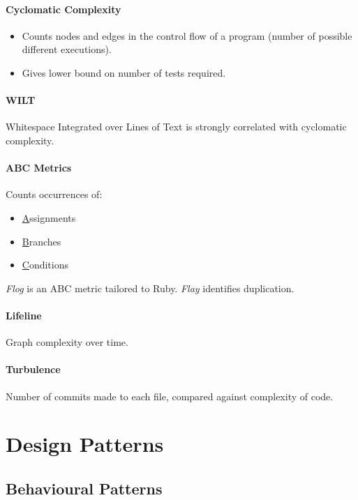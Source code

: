 \documentclass[twocolumn,english]{article}
\begin{document}
\paragraph{Cyclomatic Complexity}
\begin{itemize}
\item Counts nodes and edges in the control flow of a program (number of
possible different executions).
\item Gives lower bound on number of tests required.
\end{itemize}

\paragraph{WILT}

Whitespace Integrated over Lines of Text is strongly correlated with
cyclomatic complexity.

\paragraph{ABC Metrics}

Counts occurrences of:
\begin{itemize}
\item \uline{A}ssignments
\item \uline{B}ranches
\item \uline{C}onditions
\end{itemize}
\emph{Flog} is an ABC metric tailored to Ruby. \emph{Flay} identifies
duplication.

\paragraph{Lifeline}

Graph complexity over time.

\paragraph{Turbulence}

Number of commits made to each file, compared against complexity of
code.

\section{Design Patterns}

\subsection{Behavioural Patterns}
\end{document}
